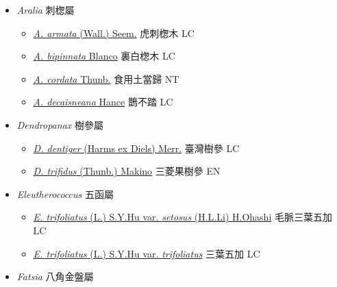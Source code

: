 
  \begin{itemize}
 \item[] \textit{Aralia} 刺楤屬
                    
  \begin{itemize}
        \item[] \href{http://www.theplantlist.org/tpl1.1/search?q=Aralia+armata}{\textit{A. armata} (Wall.) Seem.}   虎刺楤木 LC
        \item[] \href{http://www.theplantlist.org/tpl1.1/search?q=Aralia+bipinnata}{\textit{A. bipinnata} Blanco}   裏白楤木 LC
        \item[] \href{http://www.theplantlist.org/tpl1.1/search?q=Aralia+cordata}{\textit{A. cordata} Thunb.}   食用土當歸 NT
        \item[] \href{http://www.theplantlist.org/tpl1.1/search?q=Aralia+decaisneana}{\textit{A. decaisneana} Hance}   鵲不踏 LC
  \end{itemize}
 \item[] \textit{Dendropanax} 樹參屬
                    
  \begin{itemize}
        \item[] \href{http://www.theplantlist.org/tpl1.1/search?q=Dendropanax+dentiger}{\textit{D. dentiger} (Harms ex Diels) Merr.}   臺灣樹參 LC
        \item[] \href{http://www.theplantlist.org/tpl1.1/search?q=Dendropanax+trifidus}{\textit{D. trifidus} (Thunb.) Makino}   三菱果樹參 EN
  \end{itemize}
 \item[] \textit{Eleutherococcus} 五函屬
                    
  \begin{itemize}
        \item[] \href{http://www.theplantlist.org/tpl1.1/search?q=Eleutherococcus+trifoliatus+var.+setosus}{\textit{E. trifoliatus} (L.) S.Y.Hu var. \textit{setosus} (H.L.Li) H.Ohashi}   毛脈三葉五加 LC
        \item[] \href{http://www.theplantlist.org/tpl1.1/search?q=Eleutherococcus+trifoliatus+var.+trifoliatus}{\textit{E. trifoliatus} (L.) S.Y.Hu var. \textit{trifoliatus}}   三葉五加 LC
  \end{itemize}
 \item[] \textit{Fatsia} 八角金盤屬
                    

\end{itemize}
